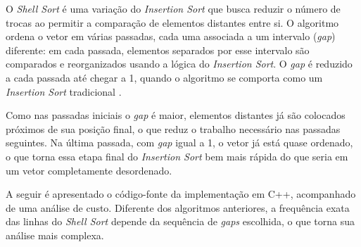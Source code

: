 
\qquad O \textit{Shell Sort} é uma variação do \textit{Insertion Sort} que busca reduzir o número de trocas ao permitir a comparação de elementos distantes entre si. O algoritmo ordena o vetor em várias passadas, cada uma associada a um intervalo (\textit{gap}) diferente: em cada passada, elementos separados por esse intervalo são comparados e reorganizados usando a lógica do \textit{Insertion Sort}. O \textit{gap} é reduzido a cada passada até chegar a 1, quando o algoritmo se comporta como um \textit{Insertion Sort} tradicional \cite{sedgewick}.


\qquad Como nas passadas iniciais o \textit{gap} é maior, elementos distantes já são colocados próximos de sua posição final, o que reduz o trabalho necessário nas passadas seguintes. Na última passada, com \textit{gap} igual a 1, o vetor já está quase ordenado, o que torna essa etapa final do \textit{Insertion Sort} bem mais rápida do que seria em um vetor completamente desordenado.

\qquad A seguir é apresentado o código-fonte da implementação em C++, acompanhado de uma análise de custo. Diferente dos algoritmos anteriores, a frequência exata das linhas do \textit{Shell Sort} depende da sequência de \textit{gaps} escolhida, o que torna sua análise mais complexa.

\vspace{1cm} %

\begin{center}
\end{center}

